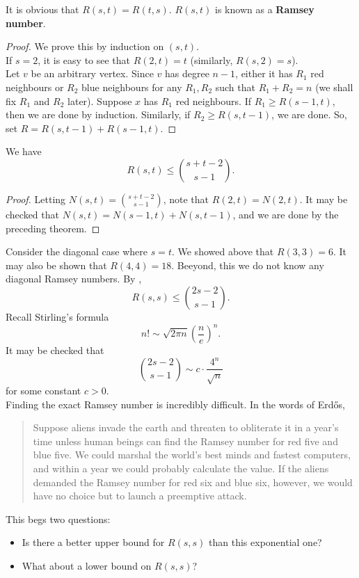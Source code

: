 	It is obvious that $R(s,t) = R(t,s)$. $R(s,t)$ is known as a \textbf{Ramsey number}. 

	\begin{proof}
		We prove this by induction on $(s,t)$.\\
		If $s=2$, it is easy to see that $R(2,t) = t$ (similarly, $R(s,2) = s$).\\
		Let $v$ be an arbitrary vertex. Since $v$ has degree $n-1$, either it has $R_1$ red neighbours or $R_2$ blue neighbours for any $R_1,R_2$ such that $R_1 + R_2 = n$ (we shall fix $R_1$ and $R_2$ later). Suppose $x$ has $R_1$ red neighbours. If $R_1 \ge R(s-1,t)$, then we are done by induction. Similarly, if $R_2 \ge R(s,t-1)$, we are done. So, set $R = R(s,t-1) + R(s-1,t)$.
	\end{proof}

	\begin{fcor}
		\label{cor: trivial ramsey bound}
		We have
		\[ R(s,t) \le \binom{s+t-2}{s-1}. \]
	\end{fcor}
	\begin{proof}
		Letting $N(s,t) = \binom{s+t-2}{s-1}$, note that $R(2,t) = N(2,t)$. It may be checked that $N(s,t) = N(s-1,t) + N(s,t-1)$, and we are done by the preceding theorem.
	\end{proof}

	Consider the diagonal case where $s=t$. We showed above that $R(3,3) = 6$. It may also be shown that $R(4,4) = 18$. Beeyond, this we do not know any diagonal Ramsey numbers. By ,
	\[ R(s,s) \le \binom{2s-2}{s-1}. \]
	Recall Stirling's formula
	\[ n! \sim \sqrt{2\pi n} \left( \frac{n}{e} \right)^n. \]
	It may be checked that
	\[ \binom{2s-2}{s-1} \sim c \cdot \frac{4^n}{\sqrt{n}} \]
	for some constant $c>0$.\\
	Finding the exact Ramsey number is incredibly difficult. In the words of Erd\H{o}s,
	\begin{quote}
		Suppose aliens invade the earth and threaten to obliterate it in a year's time unless human beings can find the Ramsey number for red five and blue five. We could marshal the world's best minds and fastest computers, and within a year we could probably calculate the value. If the aliens demanded the Ramsey number for red six and blue six, however, we would have no choice but to launch a preemptive attack.
	\end{quote}

	This begs two questions:
	\begin{itemize}
	 	\item Is there a better upper bound for $R(s,s)$ than this exponential one? 
	 	\item What about a lower bound on $R(s,s)$?
	 \end{itemize}


